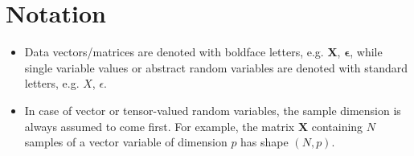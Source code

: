 
\chapter*{Notation} 

\begin{itemize}
    \item Data vectors/matrices are denoted with boldface letters, e.g.
      $\mathbf{X}$, $\bm{\epsilon}$, while single variable values or
      abstract random variables are denoted with standard letters,
      e.g. $X$, $\epsilon$.
    \item In case of vector or tensor-valued
      random variables, the sample dimension is always assumed to come first.
      For example, the matrix $\mathbf{X}$ containing $N$ samples of a
      vector variable of dimension $p$ has shape $(N, p)$.
\end{itemize}